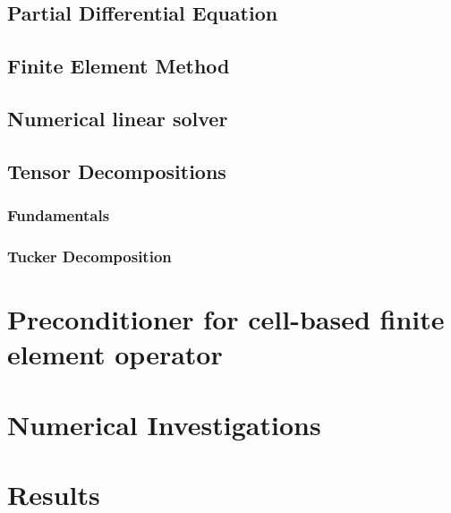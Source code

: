 \documentclass[12pt,a4paper]{scrartcl}
\numberwithin{equation}{section}
\begin{document}
\subsection{Partial Differential Equation}
\subsection{Finite Element Method}
\subsection{Numerical linear solver}
\subsection{Tensor Decompositions}
\subsubsection{Fundamentals}
\subsubsection{Tucker Decomposition}



\section{Preconditioner for cell-based finite element operator }




\section{Numerical Investigations}




\section{Results}





\newpage
\begin{thebibliography}{Lam00}
\end{thebibliography}
 



\end{document}
